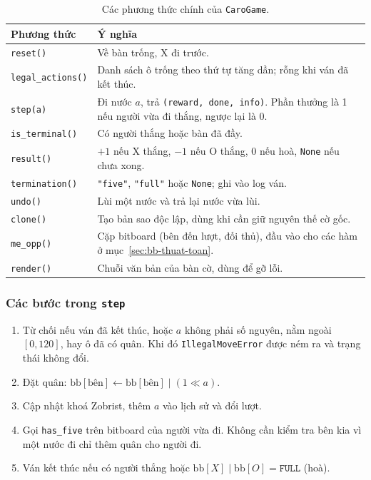 \begin{table}[H]
  \centering\small
  \caption{Các phương thức chính của \texttt{CaroGame}.}
  \label{tab:api}
  \begin{tabularx}{\textwidth}{@{}lX@{}}
    \toprule
    \textbf{Phương thức} & \textbf{Ý nghĩa} \\
    \midrule
    \texttt{reset()} & Về bàn trống, X đi trước. \\
    \texttt{legal\_actions()} & Danh sách ô trống theo thứ tự tăng dần; rỗng khi ván đã kết thúc. \\
    \texttt{step(a)} & Đi nước $a$, trả \texttt{(reward, done, info)}. Phần thưởng là 1 nếu người vừa đi thắng, ngược lại là 0. \\
    \texttt{is\_terminal()} & Có người thắng hoặc bàn đã đầy. \\
    \texttt{result()} & $+1$ nếu X thắng, $-1$ nếu O thắng, 0 nếu hoà, \texttt{None} nếu chưa xong. \\
    \texttt{termination()} & \texttt{"five"}, \texttt{"full"} hoặc \texttt{None}; ghi vào log ván. \\
    \texttt{undo()} & Lùi một nước và trả lại nước vừa lùi. \\
    \texttt{clone()} & Tạo bản sao độc lập, dùng khi cần giữ nguyên thế cờ gốc. \\
    \texttt{me\_opp()} & Cặp bitboard (bên đến lượt, đối thủ), đầu vào cho các hàm ở mục~\ref{sec:bb-thuat-toan}. \\
    \texttt{render()} & Chuỗi văn bản của bàn cờ, dùng để gỡ lỗi. \\
    \bottomrule
  \end{tabularx}
\end{table}

\subsubsection{Các bước trong \texttt{step}}
\begin{enumerate}
  \item Từ chối nếu ván đã kết thúc, hoặc $a$ không phải số nguyên, nằm ngoài $[0, 120]$, hay ô đã có quân. Khi đó \texttt{IllegalMoveError} được ném ra và trạng thái không đổi.
  \item Đặt quân: $\mathrm{bb}[\text{bên}] \leftarrow \mathrm{bb}[\text{bên}] \mid (1 \ll a)$.
  \item Cập nhật khoá Zobrist, thêm $a$ vào lịch sử và đổi lượt.
  \item Gọi \texttt{has\_five} trên bitboard của người vừa đi. Không cần kiểm tra bên kia vì một nước đi chỉ thêm quân cho người đi.
  \item Ván kết thúc nếu có người thắng hoặc $\mathrm{bb}[X] \mid \mathrm{bb}[O] = \texttt{FULL}$ (hoà).
\end{enumerate}

